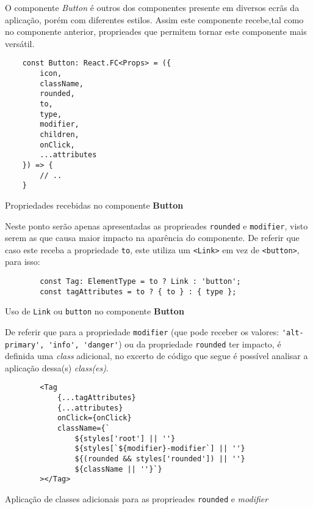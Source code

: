 
O componente \textit{Button} é outros dos componentes presente em diversos ecrãs da aplicação, porém com diferentes estilos. Assim este componente recebe,tal como no componente anterior, proprieades que permitem tornar este componente mais versátil.

\begin{longlisting}
	\begin{verbatim}
	const Button: React.FC<Props> = ({
		icon,
		className,
		rounded,
		to,
		type,
		modifier,
		children,
		onClick,
		...attributes
	}) => {
		// ..
	}
	\end{verbatim}
	\caption{Propriedades recebidas no componente \textbf{Button}}
\end{longlisting}

Neste ponto serão apenas apresentadas as proprieades \texttt{rounded} e \texttt{modifier}, visto serem as que causa maior impacto na aparência do componente. De referir que caso este receba a propriedade \texttt{to}, este utiliza um \verb|<Link>| em vez de \verb|<button>|, para isso:

\begin{longlisting}
	\begin{verbatim}
		const Tag: ElementType = to ? Link : 'button';
		const tagAttributes = to ? { to } : { type };
	\end{verbatim}
	\caption{Uso de \texttt{Link} ou \texttt{button} no componente \textbf{Button}}
\end{longlisting}

De referir que para a propriedade \texttt{modifier} (que pode receber os valores: \verb|'alt-primary', 'info', 'danger'|) ou da propriedade \texttt{rounded} ter impacto, é definida uma \textit{class} \textbf{} adicional, no excerto de código que segue é possível analisar a aplicação dessa(s) \textit{class(es)}.

\begin{longlisting}
	\begin{verbatim}
		<Tag
			{...tagAttributes}
			{...attributes}
			onClick={onClick}
			className={`
				${styles['root'] || ''}
				${styles[`${modifier}-modifier`] || ''}
				${(rounded && styles['rounded']) || ''}
				${className || ''}`}
		></Tag>
	\end{verbatim}
	\caption{Aplicação de classes adicionais para as proprieades \texttt{rounded} e \textit{modifier}}
\end{longlisting}

